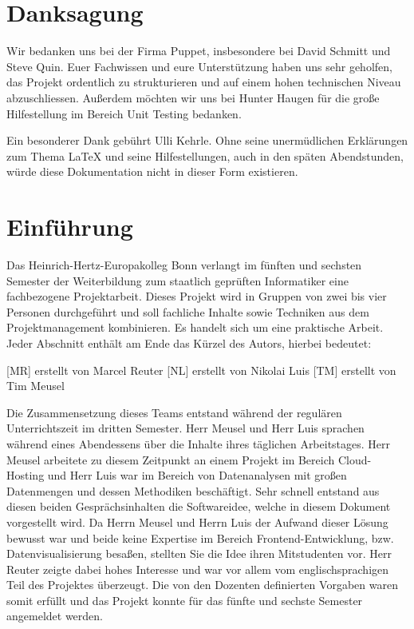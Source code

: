 \chapter*{Danksagung}
Wir bedanken uns bei der Firma Puppet, insbesondere bei David Schmitt und Steve
Quin. Euer Fachwissen und eure Unterstützung haben uns sehr geholfen, das
Projekt ordentlich zu strukturieren und auf einem hohen technischen Niveau
abzuschliessen. Außerdem möchten wir uns bei Hunter Haugen für die
große Hilfestellung im Bereich Unit Testing bedanken.

Ein besonderer Dank gebührt Ulli Kehrle. Ohne seine unermüdlichen Erklärungen
zum Thema \LaTeX{} und seine Hilfestellungen, auch in den späten Abendstunden,
würde diese Dokumentation nicht in dieser Form existieren.

\newpage

\tableofcontents
\listoffigures
\begingroup
\let\clearpage\relax
\lstlistoflistings{}
\listoftables
\endgroup

\chapter{Einführung}
\label{chap:einfuehrung}
Das Heinrich-Hertz-Europakolleg Bonn verlangt im fünften und sechsten Semester
der Weiterbildung zum staatlich geprüften Informatiker eine fachbezogene
Projektarbeit. Dieses Projekt wird in Gruppen von zwei bis vier Personen
durchgeführt und soll fachliche Inhalte sowie Techniken aus dem
Projektmanagement kombinieren. Es handelt sich um eine praktische Arbeit. Jeder
Abschnitt enthält am Ende das Kürzel des Autors, hierbei bedeutet:

\begin{outline}
  \1 {[MR]} erstellt von Marcel Reuter
  \1 {[NL]} erstellt von Nikolai Luis
  \1 {[TM]} erstellt von Tim Meusel
\end{outline}

Die Zusammensetzung dieses Teams entstand während der regulären Unterrichtszeit
im dritten Semester. Herr Meusel und Herr Luis sprachen während eines
Abendessens über die Inhalte ihres täglichen Arbeitstages. Herr Meusel arbeitete
zu diesem Zeitpunkt an einem Projekt im Bereich Cloud-Hosting und Herr Luis war
im Bereich von Datenanalysen mit großen Datenmengen und dessen Methodiken
beschäftigt. Sehr schnell entstand aus diesen beiden Gesprächsinhalten die
Softwareidee, welche in diesem Dokument vorgestellt wird. Da Herrn Meusel und
Herrn Luis der Aufwand dieser Lösung bewusst war und beide keine Expertise im
Bereich Frontend-Entwicklung, bzw. Datenvisualisierung besaßen, stellten Sie
die Idee ihren Mitstudenten vor. Herr Reuter zeigte dabei hohes Interesse und
war vor allem vom englischsprachigen Teil des Projektes überzeugt. Die von den
Dozenten definierten Vorgaben waren somit erfüllt und das Projekt konnte für
das fünfte und sechste Semester angemeldet werden.

